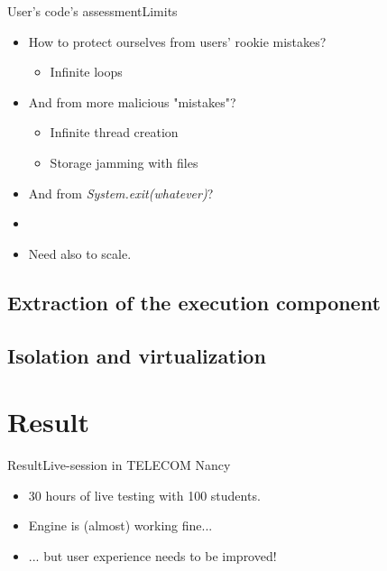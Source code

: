\documentclass{beamer}
\begin{document}
\begin{frame}{User's code's assessment}{Limits}
  \begin{itemize}
  \item {
    How to protect ourselves from users' rookie mistakes?
    \begin{itemize}
    \item {
      Infinite loops
    }
    \end{itemize}
    \pause
  }
  \item {
    And from more malicious "mistakes"?
    \begin{itemize}
    \item {
      Infinite thread creation
    }
    \item {
      Storage jamming with files
    }
    \end{itemize}
    \pause
  }
  \item {
    And from \emph{System.exit(whatever)}?
    \pause
  }
  \item[~]
  \item {
    Need also to scale.
  }
  \end{itemize}
\end{frame}

\subsection{Extraction of the execution component}



\subsection{Isolation and virtualization}



\section{Result}

\begin{frame}{Result}{Live-session in TELECOM Nancy}
  \begin{itemize}
  \item {
    30 hours of live testing with 100 students.
    \pause
  }
  \item {
    Engine is (almost) working fine...
    \pause
  }
  \item {
    ... but user experience needs to be improved!
  }
  \end{itemize}
\end{frame}
\end{document}
